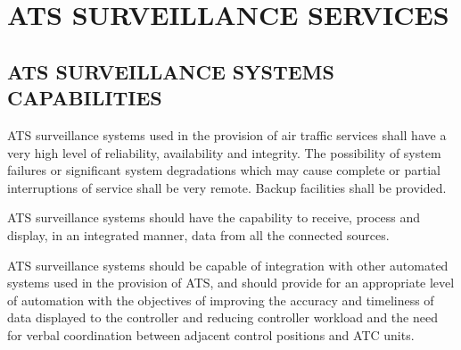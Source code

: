 \chapterbegin

\section[ATS Surveillance Services]{ATS SURVEILLANCE SERVICES}


\subsection[ATS surveillance systems capabilities]{ATS SURVEILLANCE SYSTEMS CAPABILITIES}

\begin{enumnoss}
    \item ATS surveillance systems used in the provision of air traffic services shall have a very high level of reliability, availability and integrity. The possibility of system failures or significant system degradations which may cause complete or partial interruptions of service shall be very remote. Backup facilities shall be provided.
    \item ATS surveillance systems should have the capability to receive, process and display, in an integrated manner, data from all the connected sources.
    \item ATS surveillance systems should be capable of integration with other automated systems used in the provision of ATS, and should provide for an appropriate level of automation with the objectives of improving the accuracy and timeliness of data displayed to the controller and reducing controller workload and the need for verbal coordination between adjacent control positions and ATC units.

\end{enumnoss}
